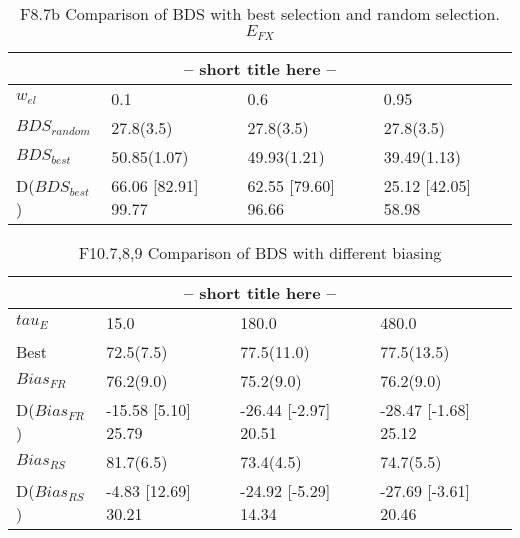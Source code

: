 \clearpage
\begin{landscape}
\begin{table}[h]
\label{at:xx}
\begin{center}
\begin{tabular}{llll}
\toprule
\multicolumn{4}{c}{-- short title here --}\\
\midrule
$w_{el}$ & 0.1 & 0.6 & 0.95\\
\midrule
$BDS_{random}$ & 27.8(3.5) & 27.8(3.5) & 27.8(3.5)\\
\midrule
$BDS_{best}$ & 50.85(1.07) & 49.93(1.21) & 39.49(1.13)\\
D($BDS_{best}$) & 66.06 [82.91] 99.77 & 62.55 [79.60] 96.66 & 25.12 [42.05] 58.98\\
\bottomrule
\end{tabular}
\end{center}
\caption{F8.7b Comparison of BDS with best selection and random selection. $E_{FX}$}
\end{table}
\end{landscape}


\clearpage
\begin{landscape}
\begin{table}[h]
\label{at:xx}
\begin{center}
\begin{tabular}{llll}
\toprule
\multicolumn{4}{c}{-- short title here --}\\
\midrule
$tau_E$ & 15.0 & 180.0 & 480.0\\
\midrule
Best & 72.5(7.5) & 77.5(11.0) & 77.5(13.5)\\
\midrule
$Bias_{FR}$ & 76.2(9.0) & 75.2(9.0) & 76.2(9.0)\\
D($Bias_{FR}$) & -15.58 [5.10] 25.79 & -26.44 [-2.97] 20.51 & -28.47 [-1.68] 25.12\\
$Bias_{RS}$ & 81.7(6.5) & 73.4(4.5) & 74.7(5.5)\\
D($Bias_{RS}$) & -4.83 [12.69] 30.21 & -24.92 [-5.29] 14.34 & -27.69 [-3.61] 20.46\\
\bottomrule
\end{tabular}
\end{center}
\caption{F10.7,8,9 Comparison of BDS with different biasing}
\end{table}
\end{landscape}


